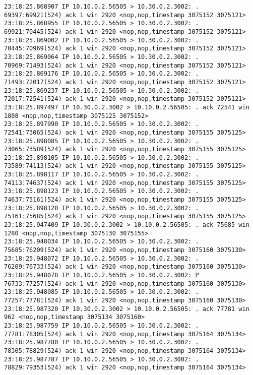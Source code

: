 \documentclass[a4paper,12pt]{article}
\begin{document}
\begin{Verbatim}
23:18:25.868907 IP 10.10.0.2.56505 > 10.30.0.2.3002: . 69397:69921(524) ack 1 win 2920 <nop,nop,timestamp 3075152 3075121>
23:18:25.868955 IP 10.10.0.2.56505 > 10.30.0.2.3002: . 69921:70445(524) ack 1 win 2920 <nop,nop,timestamp 3075152 3075121>
23:18:25.869002 IP 10.10.0.2.56505 > 10.30.0.2.3002: . 70445:70969(524) ack 1 win 2920 <nop,nop,timestamp 3075152 3075121>
23:18:25.869064 IP 10.10.0.2.56505 > 10.30.0.2.3002: . 70969:71493(524) ack 1 win 2920 <nop,nop,timestamp 3075152 3075121>
23:18:25.869176 IP 10.10.0.2.56505 > 10.30.0.2.3002: . 71493:72017(524) ack 1 win 2920 <nop,nop,timestamp 3075152 3075121>
23:18:25.869237 IP 10.10.0.2.56505 > 10.30.0.2.3002: . 72017:72541(524) ack 1 win 2920 <nop,nop,timestamp 3075152 3075121>
23:18:25.897497 IP 10.30.0.2.3002 > 10.10.0.2.56505: . ack 72541 win 1808 <nop,nop,timestamp 3075125 3075152>
23:18:25.897990 IP 10.10.0.2.56505 > 10.30.0.2.3002: . 72541:73065(524) ack 1 win 2920 <nop,nop,timestamp 3075155 3075125>
23:18:25.898085 IP 10.10.0.2.56505 > 10.30.0.2.3002: . 73065:73589(524) ack 1 win 2920 <nop,nop,timestamp 3075155 3075125>
23:18:25.898105 IP 10.10.0.2.56505 > 10.30.0.2.3002: . 73589:74113(524) ack 1 win 2920 <nop,nop,timestamp 3075155 3075125>
23:18:25.898117 IP 10.10.0.2.56505 > 10.30.0.2.3002: . 74113:74637(524) ack 1 win 2920 <nop,nop,timestamp 3075155 3075125>
23:18:25.898123 IP 10.10.0.2.56505 > 10.30.0.2.3002: . 74637:75161(524) ack 1 win 2920 <nop,nop,timestamp 3075155 3075125>
23:18:25.898128 IP 10.10.0.2.56505 > 10.30.0.2.3002: . 75161:75685(524) ack 1 win 2920 <nop,nop,timestamp 3075155 3075125>
23:18:25.947409 IP 10.30.0.2.3002 > 10.10.0.2.56505: . ack 75685 win 1280 <nop,nop,timestamp 3075130 3075155>
23:18:25.948034 IP 10.10.0.2.56505 > 10.30.0.2.3002: . 75685:76209(524) ack 1 win 2920 <nop,nop,timestamp 3075160 3075130>
23:18:25.948072 IP 10.10.0.2.56505 > 10.30.0.2.3002: . 76209:76733(524) ack 1 win 2920 <nop,nop,timestamp 3075160 3075130>
23:18:25.948078 IP 10.10.0.2.56505 > 10.30.0.2.3002: P 76733:77257(524) ack 1 win 2920 <nop,nop,timestamp 3075160 3075130>
23:18:25.948085 IP 10.10.0.2.56505 > 10.30.0.2.3002: . 77257:77781(524) ack 1 win 2920 <nop,nop,timestamp 3075160 3075130>
23:18:25.987320 IP 10.30.0.2.3002 > 10.10.0.2.56505: . ack 77781 win 962 <nop,nop,timestamp 3075134 3075160>
23:18:25.987759 IP 10.10.0.2.56505 > 10.30.0.2.3002: . 77781:78305(524) ack 1 win 2920 <nop,nop,timestamp 3075164 3075134>
23:18:25.987780 IP 10.10.0.2.56505 > 10.30.0.2.3002: . 78305:78829(524) ack 1 win 2920 <nop,nop,timestamp 3075164 3075134>
23:18:25.987787 IP 10.10.0.2.56505 > 10.30.0.2.3002: . 78829:79353(524) ack 1 win 2920 <nop,nop,timestamp 3075164 3075134>

\end{Verbatim}
\end{document}
